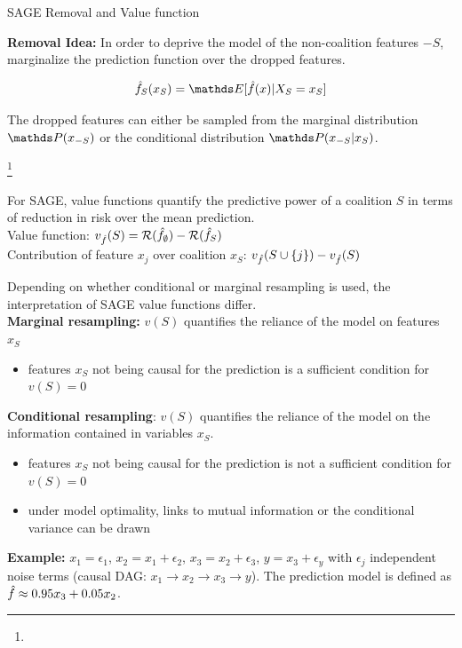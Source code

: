 \documentclass[11pt,compress,t,notes=noshow, xcolor=table]{beamer}
\begin{document}
\begin{vbframe}{SAGE Removal and Value function}
  
 \textbf{Removal Idea:} In order to deprive the model of the non-coalition features $-S$, marginalize the prediction function over the dropped features.

$$\fh_S(x_S) = \E[\fh(x) | X_S = x_S]$$
  
The dropped features can either be sampled from the marginal distribution $\P(x_{-S})$ or the conditional distribution $\P(x_{-S}|x_S)$.\\
\lz

\footnote[frame]{}

For SAGE, value functions quantify the predictive power of a coalition $S$ in terms of reduction in risk over the mean prediction.\\
\lz
Value function:  $ v_{\fh}(S) = \risk(\fh_{\emptyset}) - \risk(\fh_{S})$\\
\lz
Contribution of feature $x_j$ over coalition $x_S$:  $v_{\fh}(S \cup \{j\}) - v_{\fh}(S)$\\
\lz

\framebreak

Depending on whether conditional or marginal resampling is used, the interpretation of SAGE value functions differ.\\
\lz
\textbf{Marginal resampling:} $v(S)$ quantifies the reliance of the model on features $x_S$
\begin{itemize}
  \item features $x_S$ not being causal for the prediction is a sufficient condition for $v(S) = 0$
\end{itemize}

\textbf{Conditional resampling}: $v(S)$ quantifies the reliance of the model on the information contained in variables $x_S$.
\begin{itemize}
  \item features $x_S$ not being causal for the prediction is not a sufficient condition for $v(S) = 0$
  \item under model optimality, links to mutual information or the conditional variance can be drawn
\end{itemize}

\framebreak

\textbf{Example:} $x_1 = \epsilon_1$, $x_2 = x_1 + \epsilon_2$, $x_3 = x_2 + \epsilon_3$, $y = x_3 + \epsilon_y$ with $\epsilon_j$ independent noise terms (causal DAG: $x_1 \rightarrow x_2 \rightarrow x_3 \rightarrow y$). The prediction model is defined as  $\fh \approx 0.95 x_3 + 0.05 x_2$. 


\end{vbframe}
\end{document}
